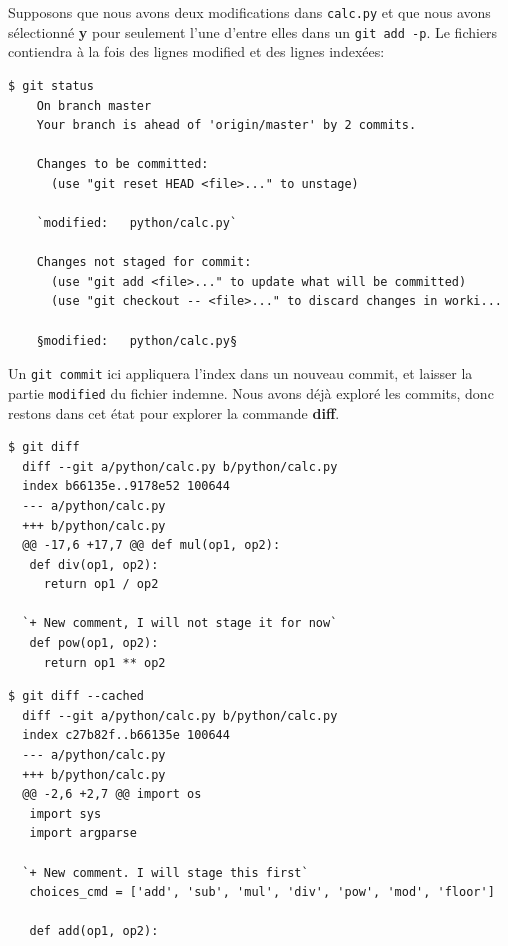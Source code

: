 \documentclass{../../common/tufte-latex/tufte-handout}
\begin{document}
Supposons que nous avons deux modifications dans \texttt{calc.py} et que nous avons sélectionné \textbf{y} pour seulement l'une d'entre elles dans un \texttt{git add -p}.
Le fichiers contiendra à la fois des lignes modified et des lignes indexées:

\begin{lstlisting}[style=BashInputStyle]
  $ git status
    On branch master
    Your branch is ahead of 'origin/master' by 2 commits.
  
    Changes to be committed:
      (use "git reset HEAD <file>..." to unstage)
  
    `modified:   python/calc.py`
  
    Changes not staged for commit:
      (use "git add <file>..." to update what will be committed)
      (use "git checkout -- <file>..." to discard changes in worki...
  
    §modified:   python/calc.py§
\end{lstlisting}

Un \texttt{git commit} ici appliquera l'index dans un nouveau commit, et laisser la partie \texttt{modified} du fichier indemne.
Nous avons déjà exploré les commits, donc restons dans cet état pour explorer la commande \textbf{diff}.

\begin{lstlisting}[style=BashInputStyle]
  $ git diff
  diff --git a/python/calc.py b/python/calc.py
  index b66135e..9178e52 100644
  --- a/python/calc.py
  +++ b/python/calc.py
  @@ -17,6 +17,7 @@ def mul(op1, op2):
   def div(op1, op2):
     return op1 / op2
 
  `+ New comment, I will not stage it for now`
   def pow(op1, op2):
     return op1 ** op2
 \end{lstlisting}
 \begin{lstlisting}[style=BashInputStyle]
  $ git diff --cached
  diff --git a/python/calc.py b/python/calc.py
  index c27b82f..b66135e 100644
  --- a/python/calc.py
  +++ b/python/calc.py
  @@ -2,6 +2,7 @@ import os
   import sys
   import argparse
 
  `+ New comment. I will stage this first`
   choices_cmd = ['add', 'sub', 'mul', 'div', 'pow', 'mod', 'floor']
 
   def add(op1, op2):
\end{lstlisting}
\end{document}
